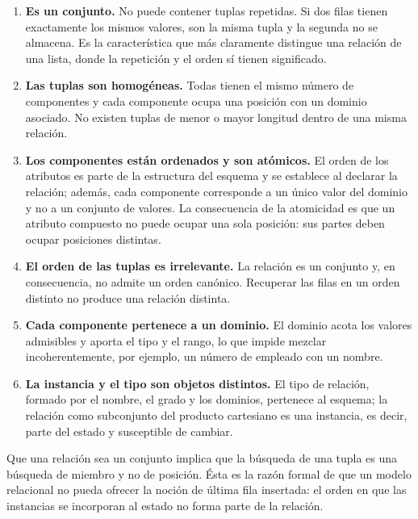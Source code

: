 \begin{enumerate}[leftmargin=1.9em,itemsep=0.4em]
  \item \textbf{Es un conjunto.} No puede contener tuplas repetidas. Si dos
    filas tienen exactamente los mismos valores, son la misma tupla y la
    segunda no se almacena. Es la característica que más claramente distingue
    una relación de una lista, donde la repetición y el orden sí tienen
    significado.
  \item \textbf{Las tuplas son homogéneas.} Todas tienen el mismo número de
    componentes y cada componente ocupa una posición con un dominio asociado.
    No existen tuplas de menor o mayor longitud dentro de una misma relación.
  \item \textbf{Los componentes están ordenados y son atómicos.} El orden de
    los atributos es parte de la estructura del esquema y se establece al
    declarar la relación; además, cada componente corresponde a un único valor
    del dominio y no a un conjunto de valores. La consecuencia de la
    atomicidad es que un atributo compuesto no puede ocupar una sola posición:
    sus partes deben ocupar posiciones distintas.
  \item \textbf{El orden de las tuplas es irrelevante.} La relación es un
    conjunto y, en consecuencia, no admite un orden canónico. Recuperar las
    filas en un orden distinto no produce una relación distinta.
  \item \textbf{Cada componente pertenece a un dominio.} El dominio acota los
    valores admisibles y aporta el tipo y el rango, lo que impide mezclar
    incoherentemente, por ejemplo, un número de empleado con un nombre.
  \item \textbf{La instancia y el tipo son objetos distintos.} El tipo de
    relación, formado por el nombre, el grado y los dominios, pertenece al
    esquema; la relación como subconjunto del producto cartesiano es una
    instancia, es decir, parte del estado y susceptible de cambiar.
\end{enumerate}

\begin{conceptobox}
Que una relación sea un conjunto implica que la búsqueda de una tupla es una
  búsqueda de miembro y no de posición. Ésta es la razón formal de que un
  modelo relacional no pueda ofrecer la noción de última fila insertada: el
  orden en que las instancias se incorporan al estado no forma parte de la
  relación.
\end{conceptobox}

